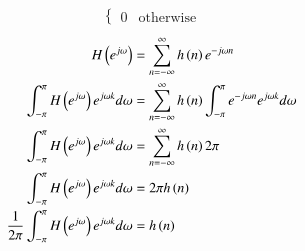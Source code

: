\begin{enumerate}[label=\thesection.\arabic*]
\begin{align}
\begin{cases}
		0 & \textrm{otherwise}
	\end{cases}
\end{align}
\begin{align}
	H\left(e^{j\omega}\right) &= \sum_{n=-\infty}^{\infty} h\left(n\right) e^{-j\omega n}
	\\
	\int_{-\pi}^{\pi}H\left(e^{j\omega}\right)e^{j\omega k}d\omega &= \sum_{n=-\infty}^{\infty} h\left(n\right) \int_{-\pi}^{\pi} e^{-j\omega n}e^{j\omega k}d\omega
    \\
	\int_{-\pi}^{\pi}H\left(e^{j\omega}\right)e^{j\omega k}d\omega &= \sum_{n=-\infty}^{\infty} h\left(n\right) 2\pi
    \\
    \int_{-\pi}^{\pi}H\left(e^{j\omega}\right)e^{j\omega k}d\omega &= 2\pi h\left(n\right) 
	\\
	\frac{1}{2\pi} \int_{-\pi}^{\pi}H\left(e^{j\omega}\right)e^{j\omega k}d\omega &= h\left(n\right) 
\end{align} 
\end{enumerate}
